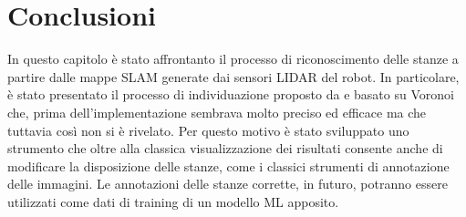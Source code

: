 \section{Conclusioni}
In questo capitolo è stato affrontanto il processo di riconoscimento delle stanze a partire dalle mappe SLAM generate dai sensori LIDAR del robot. In particolare, è stato presentato il processo di individuazione proposto da \cite{mora} e basato su Voronoi \cite{thrun} che, prima dell'implementazione sembrava molto preciso ed efficace ma che tuttavia così non si è rivelato. Per questo motivo è stato sviluppato uno strumento che oltre alla classica visualizzazione dei risultati consente anche di modificare la disposizione delle stanze, come i classici strumenti di annotazione delle immagini. Le annotazioni delle stanze corrette, in futuro, potranno essere utilizzati come dati di training di un modello ML apposito.